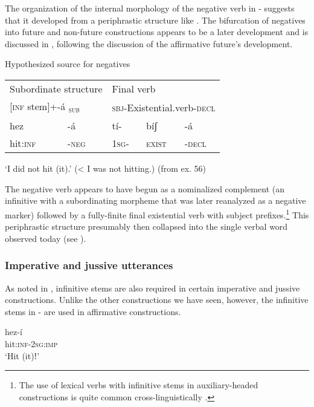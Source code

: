 \documentclass[output=paper]{langsci/langscibook}
\begin{document}
The organization of the internal morphology of the negative verb in - suggests that it developed from a periphrastic structure like . The bifurcation of negatives into future and non-future constructions appears to be a later development and is discussed in , following the discussion of the affirmative future's development.


\ea\label{ex:mahland:60}{Hypothesized source for negatives}\\
\begin{tabular}{lllll}
\multicolumn{2}{l}{Subordinate structure} & \multicolumn{3}{l}{Final verb} \\
\multicolumn{2}{l}{[\textsc{inf} stem]+-á \textsubscript{\textsc{sub}}} & \multicolumn{3}{l}{\textsc{sbj}{}-Existential.verb-\textsc{decl}} \\
hez       &         {}-á         &        tí-        &   bíʃ   &   {}-á\\
hit\textsc{:inf}      &    \textsc{{}-neg} & \textsc{1sg}{}-   &   \textsc{exist} &  \textsc{{}-decl} \\
\end{tabular}
\glt `I did not hit (it).' ({\textless} I was not hitting.)  (from ex. 56)
\z
 
The negative verb appears to have begun as a nominalized complement (an infinitive with a subordinating morpheme that was later reanalyzed as a negative marker) followed by a fully-finite final existential verb with subject prefixes.\footnote{The use of lexical verbs with infinitive stems in auxiliary-headed constructions is quite common cross-linguistically \citep[56]{Anderson2006}.} This periphrastic structure presumably then collapsed into the single verbal word observed today (see ).

\subsubsection{Imperative and jussive utterances}\label{sec:mahland:3.1.2}


As noted in , infinitive stems are also required in certain imperative and jussive constructions. Unlike the other constructions we have seen, however, the infinitive stems in - are used in affirmative constructions. 

\ea\label{ex:mahland:61}
\gll hez-í\\
hit:\textsc{inf-2sg:imp}\\
\glt `Hit (it)ǃ'
\z
\end{document}
